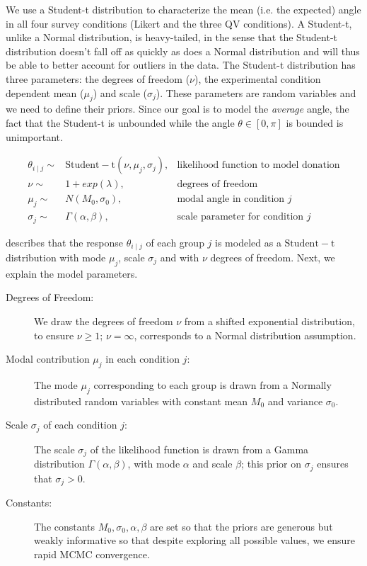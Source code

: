 We use a Student-t distribution to characterize the mean (i.e. the expected) angle in all four survey conditions (Likert and the three QV conditions). A Student-t, unlike a Normal distribution, is heavy-tailed, in the sense that the Student-t distribution doesn't fall off as quickly as does a Normal distribution and will thus be able to better account for outliers in the data. The Student-t distribution has three parameters: the degrees of freedom ($\nu$), the experimental condition dependent mean ($\mu_j$) and scale ($\sigma_j$).  These parameters are random variables and we need to define their priors. Since our goal is to model the \textit{average} angle, the fact that the Student-t is unbounded while the angle $\theta \in [0, \pi]$ is bounded is unimportant.

\begin{align}
  \theta_{i \mid j} \sim & \mathrm{Student-t}(\nu, \mu_j, \sigma_j),   & \text{likelihood function to model donation} \label{eq:bayesian formulation} \\
  \nu \sim & 1 + exp(\lambda), & \text{degrees of freedom} \\
  \mu_j \sim & N(M_0, \sigma_0), & \text{modal angle in condition } j \\
  \sigma_j \sim & \Gamma(\alpha, \beta), & \text{scale parameter for condition } j
\end{align}
 
 describes that the response $\theta_{i \mid j}$ of each group $j$ is modeled as a $\mathrm{Student-t}$ distribution with mode $\mu_j$,  scale $\sigma_j$ and with $\nu$ degrees of freedom. Next, we explain the model parameters.


\begin{description}
    \item[Degrees of Freedom:] We draw the degrees of freedom $\nu$ from a shifted exponential distribution, to ensure $\nu \geq 1$; $\nu=\infty$, corresponds to a Normal distribution assumption.
    \item[Modal contribution $\mu_j$ in each condition $j$:] The mode $\mu_j$ corresponding to each group is drawn from a Normally distributed random variables with constant mean $M_0$ and variance $\sigma_0$. 
    \item[Scale $\sigma_j$ of each condition $j$:]  The scale $\sigma_j$ of the likelihood function is drawn from a Gamma distribution $\Gamma(\alpha, \beta)$, with mode $\alpha$ and scale $\beta$; this prior on $\sigma_j$ ensures that $\sigma_j > 0$. 
    \item[Constants:] The constants $M_0, \sigma_0, \alpha, \beta$ are set so that the priors are generous but weakly informative so that despite exploring all possible values, we ensure rapid MCMC convergence.
\end{description}

